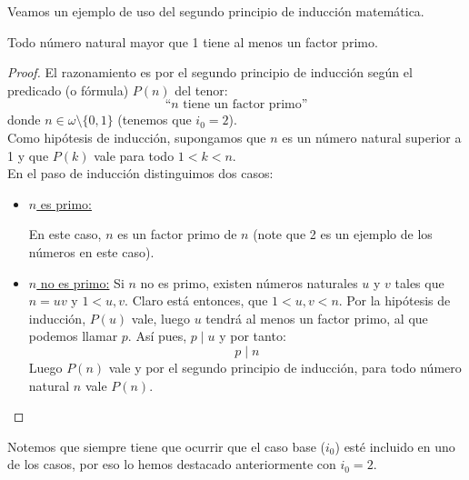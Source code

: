 Veamos un ejemplo de uso del segundo principio de inducción matemática.
\begin{ejercicio}
    Todo número natural mayor que 1 tiene al menos un factor primo.
\begin{proof}
    El razonamiento es por el segundo principio de inducción según el predicado (o fórmula) $P(n)$ del tenor:
    $$\text{``}n \text{ tiene un factor primo}\text{''}$$
    donde $n \in \omega \setminus \{ 0, 1\}$ (tenemos que $i_0 = 2$).\\

    \noindent
    Como hipótesis de inducción, supongamos que $n$ es un número natural superior a 1 y que $P(k)$ vale para todo $1<k < n$.\\

    \noindent
    En el paso de inducción distinguimos dos casos:
    
    \begin{itemize}
        \item \ul{$n$ es primo:} 

            En este caso, $n$ es un factor primo de $n$ (note que 2 es un ejemplo de los números en este caso).
        \item \ul{$n$ no es primo:}
            Si $n$ no es primo, existen números naturales $u$ y $v$ tales que $n = uv$ y $1<u,v$. Claro está entonces, que $1<u,v<n$.\newline
            Por la hipótesis de inducción, $P(u)$ vale, luego $u$ tendrá al menos un factor primo, al que podemos llamar $p$. Así pues, $p \mid u$ y por tanto:
            $$p \mid n$$
            Luego $P(n)$ vale y por el segundo principio de inducción, para todo número natural $n$ vale $P(n)$.
    \end{itemize}
\end{proof}

Notemos que siempre tiene que ocurrir que el caso base ($i_0$) esté incluido en uno de los casos, por eso lo hemos destacado anteriormente con $i_0 = 2$.
\end{ejercicio}


